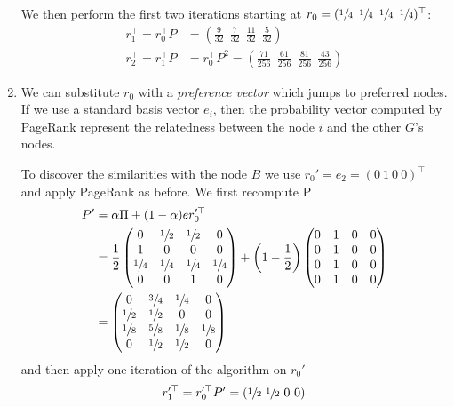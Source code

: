 \begin{enumerate}
  We then perform the first two iterations starting at $r_0 =
  (\sfrac{1}{4}\enskip\sfrac{1}{4}\enskip\sfrac{1}{4}\enskip\sfrac{1}{4})^\top$:
  \begin{align*}
    r_1^\top = r_0^\top P &= \left(\frac{9}{32}\ \ \frac{7}{32}\ \ \frac{11}{32}\ \
    \frac{5}{32} \right) \\
    r_2^\top = r_1^\top P &= r_0^\top P^2 = \left(\frac{71}{256}\ \ \frac{61}{256}\ \
    \frac{81}{256}\ \ \frac{43}{256} \right)
  \end{align*}

  \item We can substitute $r_0$ with a \emph{preference vector} which jumps to
  preferred nodes. If we use a standard basis vector $e_i$, then the probability
  vector computed by PageRank represent the relatedness between the node $i$ and
  the other $G$'s nodes.

  To discover the similarities with the node $B$ we use $r_0' = e_2 = (0\ 1\ 0\
  0)^\top$ and apply PageRank as before. We first recompute P
  \begin{align*}
    P'  &= \alpha\Pi +  (1 - \alpha) er_0'^\top \\
        &= \frac{1}{2}
            \begin{pmatrix}
              0&\sfrac{1}{2}&\sfrac{1}{2}&0 \\
              1&0&0&0\\
              \sfrac{1}{4}&\sfrac{1}{4}&\sfrac{1}{4}&\sfrac{1}{4} \\
              0&0&1&0
            \end{pmatrix}
            +
            \left( 1 - \frac{1}{2} \right)
            \begin{pmatrix}
              0&1&0&0 \\
              0&1&0&0 \\
              0&1&0&0 \\
              0&1&0&0
            \end{pmatrix} \\
        &=  \begin{pmatrix}
              0&\sfrac{3}{4}&\sfrac{1}{4}&0 \\
              \sfrac{1}{2}&\sfrac{1}{2}&0&0\\
              \sfrac{1}{8}&\sfrac{5}{8}&\sfrac{1}{8}&\sfrac{1}{8} \\
              0&\sfrac{1}{2}&\sfrac{1}{2}&0
            \end{pmatrix}
  \end{align*}
  and then apply one iteration of the algorithm on $r_0'$
  \begin{align*}
    r_1'^\top = r_0'^\top P' = \left(\sfrac{1}{2}\ \sfrac{1}{2}\ 0\ 0 \right)
  \end{align*}
  
\end{enumerate}
